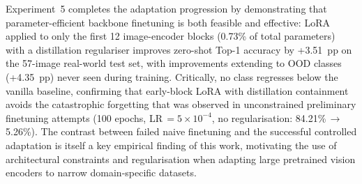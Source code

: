 \noindent Experiment~5 completes the adaptation progression by demonstrating that parameter-efficient backbone finetuning is both feasible and effective: LoRA applied to only the first 12 image-encoder blocks (0.73\% of total parameters) with a distillation regulariser improves zero-shot Top-1 accuracy by +3.51~pp on the 57-image real-world test set, with improvements extending to OOD classes (+4.35~pp) never seen during training. Critically, no class regresses below the vanilla baseline, confirming that early-block LoRA with distillation containment avoids the catastrophic forgetting that was observed in unconstrained preliminary finetuning attempts (100 epochs, LR\,$= 5 \times 10^{-4}$, no regularisation: 84.21\%\,$\rightarrow$\,5.26\%). The contrast between failed naive finetuning and the successful controlled adaptation is itself a key empirical finding of this work, motivating the use of architectural constraints and regularisation when adapting large pretrained vision encoders to narrow domain-specific datasets.
